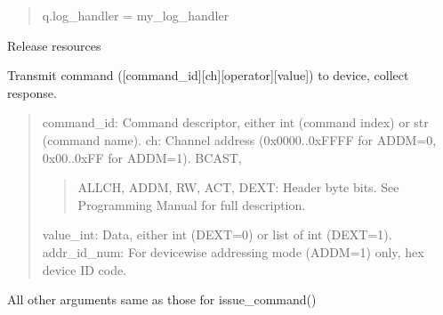 \documentclass[letterpaper,10pt,english]{sphinxmanual}
\begin{document}
\begin{fulllineitems}
\begin{quote}
q.log\_handler = my\_log\_handler
\end{quote}

\begin{fulllineitems}
\label{\detokenize{qontrol:qontrol.Qontroller.close}}
Release resources

\end{fulllineitems}


\begin{fulllineitems}
\label{\detokenize{qontrol:qontrol.Qontroller.issue_binary_command}}
Transmit command ({[}command\_id{]}{[}ch{]}{[}operator{]}{[}value{]}) to device, collect response.
\begin{quote}

command\_id:             Command descriptor, either int (command index) or str (command name).
ch:                     Channel address (0x0000..0xFFFF for ADDM=0, 0x00..0xFF for ADDM=1).
BCAST,
\begin{quote}

ALLCH,
ADDM,
RW,
ACT,
DEXT:                  Header byte bits. See Programming Manual for full description.
\end{quote}

value\_int:              Data, either int (DEXT=0) or list of int (DEXT=1).
addr\_id\_num:    For device\sphinxhyphen{}wise addressing mode (ADDM=1) only, hex device ID code.
\end{quote}

All other arguments same as those for issue\_command()

\end{fulllineitems}



\end{fulllineitems}
\end{document}
